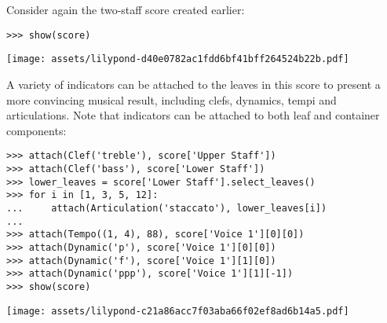 \noindent Consider again the two-staff score created earlier:

\begin{comment}
<abjad>
show(score)
</abjad>
\end{comment}

\begin{abjadbookoutput}
\begin{singlespacing}
\vspace{-0.5\baselineskip}
\begin{lstlisting}
>>> show(score)
\end{lstlisting}
\noindent\texttt{[image: assets/lilypond-d40e0782ac1fdd6bf41bff264524b22b.pdf]}
\end{singlespacing}
\end{abjadbookoutput}

\noindent A variety of indicators can be attached to the leaves in this score
to present a more convincing musical result, including clefs, dynamics, tempi
and articulations. Note that indicators can be attached to both leaf and
container components:

\begin{comment}
<abjad>
attach(Clef('treble'), score['Upper Staff'])
attach(Clef('bass'), score['Lower Staff'])
lower_leaves = score['Lower Staff'].select_leaves()
for i in [1, 3, 5, 12]:
    attach(Articulation('staccato'), lower_leaves[i])

attach(Tempo((1, 4), 88), score['Voice 1'][0][0])
attach(Dynamic('p'), score['Voice 1'][0][0])
attach(Dynamic('f'), score['Voice 1'][1][0])
attach(Dynamic('ppp'), score['Voice 1'][1][-1])
show(score)
</abjad>
\end{comment}

\begin{abjadbookoutput}
\begin{singlespacing}
\vspace{-0.5\baselineskip}
\begin{lstlisting}
>>> attach(Clef('treble'), score['Upper Staff'])
>>> attach(Clef('bass'), score['Lower Staff'])
>>> lower_leaves = score['Lower Staff'].select_leaves()
>>> for i in [1, 3, 5, 12]:
...     attach(Articulation('staccato'), lower_leaves[i])
...
>>> attach(Tempo((1, 4), 88), score['Voice 1'][0][0])
>>> attach(Dynamic('p'), score['Voice 1'][0][0])
>>> attach(Dynamic('f'), score['Voice 1'][1][0])
>>> attach(Dynamic('ppp'), score['Voice 1'][1][-1])
>>> show(score)
\end{lstlisting}
\noindent\texttt{[image: assets/lilypond-c21a86acc7f03aba66f02ef8ad6b14a5.pdf]}
\end{singlespacing}
\end{abjadbookoutput}

